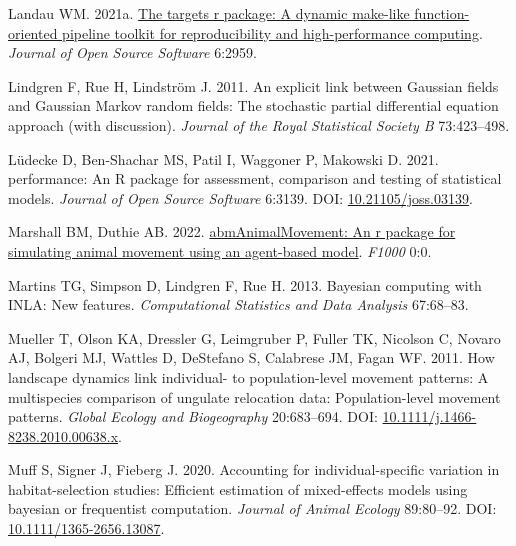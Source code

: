 \documentclass[10pt,a4paper]{article}
\newlength{\cslhangindent}
\newlength{\cslentryspacingunit} %
\newenvironment{CSLReferences}[2] %
 {%
  \setlength{\parindent}{0pt}
  \ifodd #1
  \let\oldpar\par
  \def\par{\hangindent=\cslhangindent\oldpar}
  \fi
  \setlength{\parskip}{#2\cslentryspacingunit}
 }%
 {}
\begin{document}
\begin{CSLReferences}{1}{0}
\leavevmode{}%
Landau WM. 2021a. \href{https://doi.org/10.21105/joss.02959}{The targets r package: A dynamic make-like function-oriented pipeline toolkit for reproducibility and high-performance computing}. \emph{Journal of Open Source Software} 6:2959.

\leavevmode{}%
Lindgren F, Rue H, Lindström J. 2011. An explicit link between {Gaussian} fields and {Gaussian} {Markov} random fields: The stochastic partial differential equation approach (with discussion). \emph{Journal of the Royal Statistical Society B} 73:423--498.

\leavevmode{}%
Lüdecke D, Ben-Shachar MS, Patil I, Waggoner P, Makowski D. 2021. {performance}: An {R} package for assessment, comparison and testing of statistical models. \emph{Journal of Open Source Software} 6:3139. DOI: \href{https://doi.org/10.21105/joss.03139}{10.21105/joss.03139}.

\leavevmode{}%
Marshall BM, Duthie AB. 2022. \href{https://0}{{abmAnimalMovement}: An r package for simulating animal movement using an agent-based model}. \emph{F1000} 0:0.

\leavevmode{}%
Martins TG, Simpson D, Lindgren F, Rue H. 2013. Bayesian computing with {INLA}: {N}ew features. \emph{Computational Statistics and Data Analysis} 67:68--83.

\leavevmode{}%
Mueller T, Olson KA, Dressler G, Leimgruber P, Fuller TK, Nicolson C, Novaro AJ, Bolgeri MJ, Wattles D, DeStefano S, Calabrese JM, Fagan WF. 2011. How landscape dynamics link individual- to population-level movement patterns: A multispecies comparison of ungulate relocation data: {Population}-level movement patterns. \emph{Global Ecology and Biogeography} 20:683--694. DOI: \href{https://doi.org/10.1111/j.1466-8238.2010.00638.x}{10.1111/j.1466-8238.2010.00638.x}.

\leavevmode{}%
Muff S, Signer J, Fieberg J. 2020. Accounting for individual-specific variation in habitat-selection studies: Efficient estimation of mixed-effects models using bayesian or frequentist computation. \emph{Journal of Animal Ecology} 89:80--92. DOI: \href{https://doi.org/10.1111/1365-2656.13087}{10.1111/1365-2656.13087}.


\end{CSLReferences}
\end{document}

